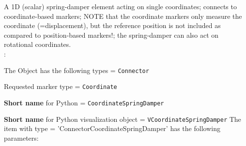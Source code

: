 %
\newpage


\label{sec:item:ObjectConnectorCoordinateSpringDamper}
A 1D (scalar) spring-damper element acting on single  coordinates; connects to coordinate-based markers; NOTE that the coordinate markers only measure the coordinate (=displacement), but the reference position is not included as compared to position-based markers!; the spring-damper can also act on rotational coordinates.
\vspace{12pt}\\

\noindent {}:
\bi
  \item The Object has the following types = \texttt{Connector}
  \item Requested marker type = \texttt{Coordinate}
  \item {\bf Short name} for Python = \texttt{CoordinateSpringDamper}
  \item {\bf Short name} for Python visualization object = \texttt{VCoordinateSpringDamper}
\ei\vspace{12pt} \noindent 
The item  with type = 'ConnectorCoordinateSpringDamper' has the following parameters:
\vspace{-0.5cm}\\
\vspace{-0.5cm}\\

